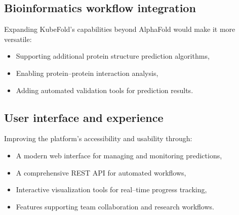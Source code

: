 \subsection{Bioinformatics workflow integration}
Expanding KubeFold's capabilities beyond AlphaFold would make it more versatile:
\begin{itemize}
    \item Supporting additional protein structure prediction algorithms,
    \item Enabling protein--protein interaction analysis,
    \item Adding automated validation tools for prediction results.
\end{itemize}

\subsection{User interface and experience}
Improving the platform's accessibility and usability through:
\begin{itemize}
    \item A modern web interface for managing and monitoring predictions,
    \item A comprehensive REST API for automated workflows,
    \item Interactive visualization tools for real--time progress tracking,
    \item Features supporting team collaboration and research workflows.
\end{itemize}
%
%
%
%
